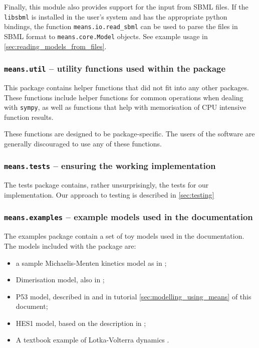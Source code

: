 Finally, this module also provides support for the input from SBML files\cite{hucka_systems_2003}.
If the \verb`libsbml` is installed in the user's system and has the appropriate python bindings, the function \verb`means.io.read_sbml` can be used to parse the files in SBML format
to \verb`means.core.Model` objects. See example usage in \autoref{sec:reading_models_from_files}.

\subsubsection{{\tt means.util} -- utility functions used within the package}
This package contains helper functions that did not fit into any other packages.
These functions include helper functions for common operations when dealing with \verb`sympy`,
as well as functions that help with memorisation of CPU intensive function results.

These functions are designed to be package-specific.
The users of the software are generally discouraged to use any of these functions.

\subsubsection{{\tt means.tests} -- ensuring the working implementation}
The tests package contains, rather unsurprisingly, the tests for our implementation.
Our approach to testing is described in \autoref{sec:testing}

\subsubsection{{\tt means.examples} -- example models used in the documentation}
The examples package contain a set of toy models used in the documentation.
The models included with the package are:
\begin{itemize}
    \item a sample Michaelis-Menten kinetics model as in \cite{ale_general_2013};
    \item Dimerisation model, also in \cite{ale_general_2013};
    \item P53 model, described in \cite{ale_general_2013} and in tutorial \autoref{sec:modelling_using_means} of this document;
    \item HES1 model, based on the description in \cite{ale_general_2013};
    \item A textbook example of Lotka-Volterra dynamics \cite{billard_lotka-volterra_1977}.
\end{itemize}

